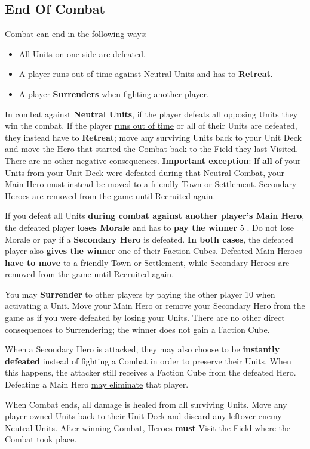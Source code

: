 \begin{multicols}{2}
\subsection*{\hypertarget{Endcombat}{End Of Combat}}
Combat can end in the following ways:
\begin{itemize}
    \item All Units on one side are defeated.
    \item A player runs out of time against Neutral Units and has to \textbf{Retreat}.
    \item A player \textbf{Surrenders} when fighting another player.
\end{itemize}
In combat against \textbf{Neutral Units}, if the player defeats all opposing Units they win the combat.
If the player \hyperlink{Timelimit}{runs out of time} or all of their Units are defeated, they instead have to \textbf{Retreat}; move any surviving Units back to your Unit Deck and move the Hero that started the Combat back to the Field they last Visited.
There are no other negative consequences.
\textbf{Important exception}: If \textbf{all} of your Units from your Unit Deck were defeated during that Neutral Combat, your Main Hero must instead be moved to a friendly Town or Settlement. Secondary Heroes are removed from the game until Recruited again.\par
If you defeat all Units \textbf{during combat against another player's Main Hero}, the defeated player \textbf{loses Morale} and has to \textbf{pay the winner} 5 .
Do not lose Morale or pay  if a \textbf{Secondary Hero} is defeated.
\textbf{In both cases}, the defeated player also \textbf{gives the winner} one of their \hyperlink{End}{Faction Cubes}.
Defeated Main Heroes \textbf{have to move} to a friendly Town or Settlement, while Secondary Heroes are removed from the game until Recruited again.\par
You may \textbf{Surrender} to other players by paying the other player 10  when activating a Unit.
Move your Main Hero or remove your Secondary Hero from the game as if you were defeated by losing your Units.
There are no other direct consequences to Surrendering; the winner does not gain a Faction Cube.\par
{}\par
When a Secondary Hero is attacked, they may also choose to be \textbf{instantly defeated} instead of fighting a Combat in order to preserve their Units.
When this happens, the attacker still receives a Faction Cube from the defeated Hero.
Defeating a Main Hero \hyperlink{End}{may eliminate} that player.\par
When Combat ends, all damage is healed from all surviving Units.
Move any player owned Units back to their Unit Deck and discard any leftover enemy Neutral Units.
After winning Combat, Heroes \textbf{must} Visit the Field where the Combat took place.


\end{multicols}
